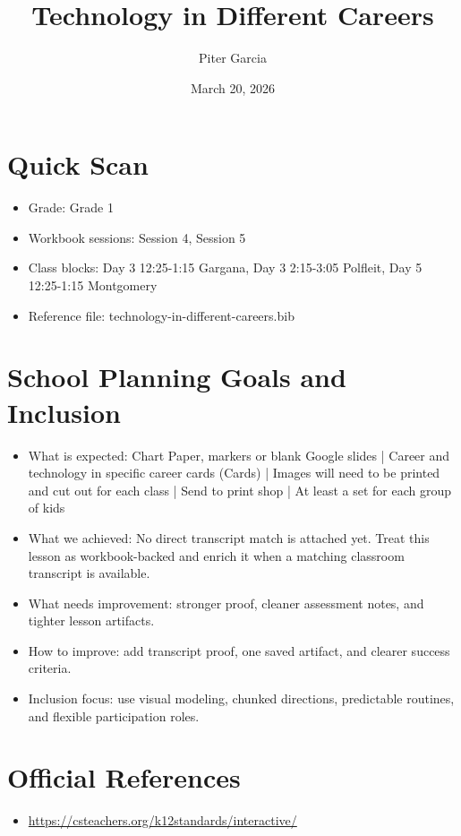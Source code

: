 \documentclass[11pt]{article}
\title{Technology in Different Careers}
\author{Piter Garcia}
\date{March 20, 2026}
\begin{document}
\maketitle
\section*{Quick Scan}
\begin{itemize}[leftmargin=*]
\item Grade: Grade 1
\item Workbook sessions: Session 4, Session 5
\item Class blocks: Day 3 12:25-1:15 Gargana, Day 3 2:15-3:05 Polfleit, Day 5 12:25-1:15 Montgomery
\item Reference file: technology-in-different-careers.bib
\end{itemize}
\section*{School Planning Goals and Inclusion}
\begin{itemize}[leftmargin=*]
\item What is expected: Chart Paper, markers or blank Google slides | Career and technology in specific career cards (Cards) | Images will need to be printed and cut out for each class | Send to print shop | At least a set for each group of kids
\item What we achieved: No direct transcript match is attached yet. Treat this lesson as workbook-backed and enrich it when a matching classroom transcript is available.
\item What needs improvement: stronger proof, cleaner assessment notes, and tighter lesson artifacts.
\item How to improve: add transcript proof, one saved artifact, and clearer success criteria.
\item Inclusion focus: use visual modeling, chunked directions, predictable routines, and flexible participation roles.
\end{itemize}
\section*{Official References}
\begin{itemize}[leftmargin=*]
\item \url{https://csteachers.org/k12standards/interactive/}

\end{itemize}
\end{document}
